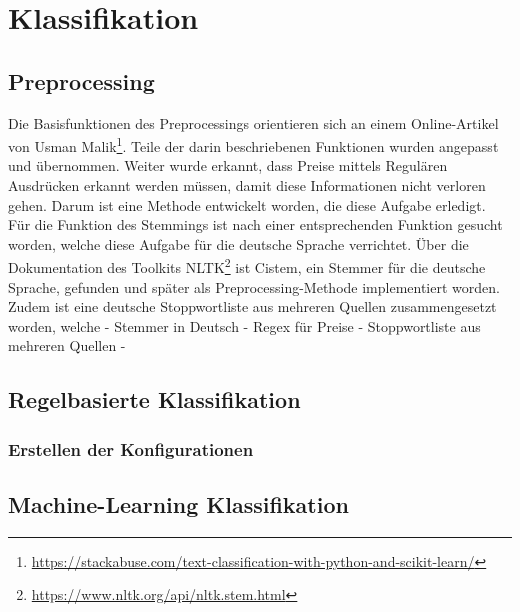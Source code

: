 \section{Klassifikation}
\subsection{Preprocessing}
Die Basisfunktionen des Preprocessings orientieren sich an einem Online-Artikel von Usman Malik\footnote{\url{https://stackabuse.com/text-classification-with-python-and-scikit-learn/}}.
Teile der darin beschriebenen Funktionen wurden angepasst und übernommen.
Weiter wurde erkannt, dass Preise mittels Regulären Ausdrücken erkannt werden müssen, damit diese Informationen nicht verloren gehen.
Darum ist eine Methode entwickelt worden, die diese Aufgabe erledigt.
Für die Funktion des Stemmings ist nach einer entsprechenden Funktion gesucht worden, welche diese Aufgabe für die deutsche Sprache verrichtet.
Über die Dokumentation des Toolkits NLTK\footnote{\url{https://www.nltk.org/api/nltk.stem.html}} ist Cistem, ein Stemmer für die deutsche Sprache, gefunden und später als Preprocessing-Methode implementiert worden.
Zudem ist eine deutsche Stoppwortliste aus mehreren Quellen zusammengesetzt worden, welche 
- Stemmer in Deutsch
- Regex für Preise
- Stoppwortliste aus mehreren Quellen
- 
\subsection{Regelbasierte Klassifikation}
\subsubsection{Erstellen der Konfigurationen}
\subsection{Machine-Learning Klassifikation}
